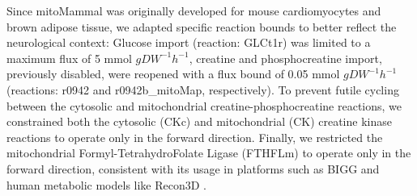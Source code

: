 Since mitoMammal was originally developed for mouse cardiomyocytes and brown adipose tissue, we adapted specific reaction bounds to better reflect the neurological context: 
Glucose import (reaction: GLCt1r) was limited to a maximum flux of 5 mmol $gDW^{-1} h^{-1}$, creatine and phosphocreatine import, previously disabled, were reopened with a flux bound of 0.05 mmol $gDW^{-1} h^{-1}$ (reactions: r0942 and r0942b\_mitoMap, respectively). To prevent futile cycling between the cytosolic and mitochondrial creatine-phosphocreatine reactions, 
we constrained both the cytosolic (CKc) and mitochondrial (CK) creatine kinase reactions to operate only in the forward direction. Finally, we restricted the mitochondrial Formyl-TetrahydroFolate Ligase (FTHFLm) to operate only in the forward direction, 
consistent with its usage in platforms such as BIGG \citep{schellenbergerBiGGBiochemicalGenetic2010} and human metabolic models like Recon3D \citep{brunkRecon3DEnablesThreedimensional2018}.

\endinput 